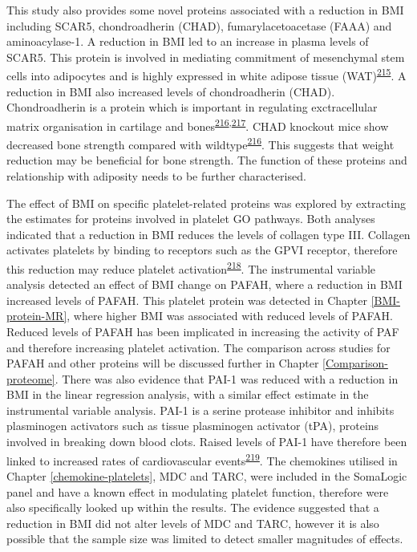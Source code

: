 \documentclass[11pt,twoside]{bristolthesis}
\begin{document}
This study also provides some novel proteins associated with a reduction in BMI including SCAR5, chondroadherin (CHAD), fumarylacetoacetase (FAAA) and aminoacylase-1. A reduction in BMI led to an increase in plasma levels of SCAR5. This protein is involved in mediating commitment of mesenchymal stem cells into adipocytes and is highly expressed in white adipose tissue (WAT)\textsuperscript{\protect\hyperlink{ref-Lee2017a}{215}}. A reduction in BMI also increased levels of chondroadherin (CHAD). Chondroadherin is a protein which is important in regulating exctracellular matrix organisation in cartilage and bones\textsuperscript{\protect\hyperlink{ref-Hessle2013}{216},\protect\hyperlink{ref-Iozzo2015}{217}}. CHAD knockout mice show decreased bone strength compared with wildtype\textsuperscript{\protect\hyperlink{ref-Hessle2013}{216}}. This suggests that weight reduction may be beneficial for bone strength. The function of these proteins and relationship with adiposity needs to be further characterised.

The effect of BMI on specific platelet-related proteins was explored by extracting the estimates for proteins involved in platelet GO pathways. Both analyses indicated that a reduction in BMI reduces the levels of collagen type III. Collagen activates platelets by binding to receptors such as the GPVI receptor, therefore this reduction may reduce platelet activation\textsuperscript{\protect\hyperlink{ref-Maurice2006}{218}}. The instrumental variable analysis detected an effect of BMI change on PAFAH, where a reduction in BMI increased levels of PAFAH. This platelet protein was detected in Chapter \ref{BMI-protein-MR}, where higher BMI was associated with reduced levels of PAFAH. Reduced levels of PAFAH has been implicated in increasing the activity of PAF and therefore increasing platelet activation. The comparison across studies for PAFAH and other proteins will be discussed further in Chapter \ref{Comparison-proteome}. There was also evidence that PAI-1 was reduced with a reduction in BMI in the linear regression analysis, with a similar effect estimate in the instrumental variable analysis. PAI-1 is a serine protease inhibitor and inhibits plasminogen activators such as tissue plasminogen activator (tPA), proteins involved in breaking down blood clots. Raised levels of PAI-1 have therefore been linked to increased rates of cardiovascular events\textsuperscript{\protect\hyperlink{ref-Morrow2021}{219}}. The chemokines utilised in Chapter \ref{chemokine-platelets}, MDC and TARC, were included in the SomaLogic panel and have a known effect in modulating platelet function, therefore were also specifically looked up within the results. The evidence suggested that a reduction in BMI did not alter levels of MDC and TARC, however it is also possible that the sample size was limited to detect smaller magnitudes of effects.
\end{document}
